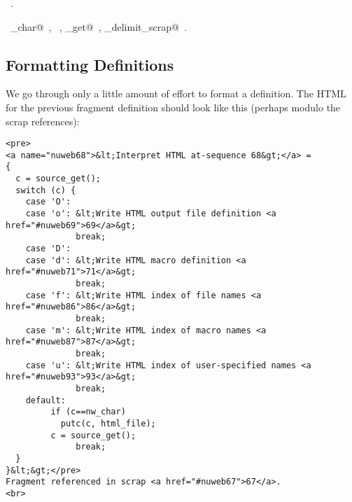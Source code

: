 \documentclass[a4paper]{report}
\begin{document}
\begin{flushleft}
\begin{minipage}{\linewidth}
\begin{list}{}{}
\mbox{}\verb@    default:@\\
\mbox{}\verb@          if (c==nw_char)@\\
\mbox{}\verb@            putc(c, html_file);@\\
\mbox{}\verb@          c = source_get();@\\
\mbox{}\verb@              break;@\\
\mbox{}\verb@  }@\\
\mbox{}\verb@}@{\NWsep}
\end{list}
\vspace{-1.5ex}
\footnotesize
\begin{list}{}{\setlength{\itemsep}{-\parsep}\setlength{\itemindent}{-\leftmargin}}
\item \NWtxtMacroRefIn\ .
\item \NWtxtIdentsUsed\nobreak\  \verb@nw_char@\nobreak\ , \verb@putc@\nobreak\ , \verb@source_get@\nobreak\ , \verb@update_delimit_scrap@\nobreak\ .
\item{}
\end{list}
\end{minipage}\vspace{4ex}
\end{flushleft}
\subsection{Formatting Definitions}

We go through only a little amount of effort to format a definition.
The HTML for the previous fragment definition should look like this
(perhaps modulo the scrap references):

\begin{verbatim}
<pre>
<a name="nuweb68">&lt;Interpret HTML at-sequence 68&gt;</a> =
{
  c = source_get();
  switch (c) {
    case 'O':
    case 'o': &lt;Write HTML output file definition <a href="#nuweb69">69</a>&gt;
              break;
    case 'D':
    case 'd': &lt;Write HTML macro definition <a href="#nuweb71">71</a>&gt;
              break;
    case 'f': &lt;Write HTML index of file names <a href="#nuweb86">86</a>&gt;
              break;
    case 'm': &lt;Write HTML index of macro names <a href="#nuweb87">87</a>&gt;
              break;
    case 'u': &lt;Write HTML index of user-specified names <a href="#nuweb93">93</a>&gt;
              break;
    default:
         if (c==nw_char)
           putc(c, html_file);
         c = source_get();
              break;
  }
}&lt;&gt;</pre>
Fragment referenced in scrap <a href="#nuweb67">67</a>.
<br>
\end{verbatim}
\end{document}
